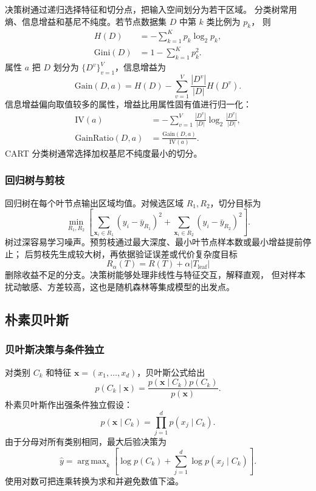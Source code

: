 \documentclass[UTF8,zihao=-4,a4paper,fontset=windows]{ctexart}
\DeclareMathOperator*{\argmax}{arg\,max}
\newcommand{\abs}[1]{\left|#1\right|}
\begin{document}
决策树通过递归选择特征和切分点，把输入空间划分为若干区域。
分类树常用熵、信息增益和基尼不纯度。若节点数据集 $D$ 中第 $k$ 类比例为 $p_k$，
则
\begin{align}
  H(D)&=-\sum_{k=1}^{K}p_k\log_2 p_k,\\
  \mathrm{Gini}(D)&=1-\sum_{k=1}^{K}p_k^2.
\end{align}
属性 $a$ 把 $D$ 划分为 $\{D^v\}_{v=1}^{V}$，信息增益为
\begin{equation}
  \mathrm{Gain}(D,a)
  =H(D)-\sum_{v=1}^{V}\frac{\abs{D^v}}{\abs D}H(D^v).
\end{equation}
信息增益偏向取值较多的属性，增益比用属性固有值进行归一化：
\begin{align}
  \mathrm{IV}(a)
  &=-\sum_{v=1}^{V}\frac{\abs{D^v}}{\abs D}
  \log_2\frac{\abs{D^v}}{\abs D},\\
  \mathrm{GainRatio}(D,a)
  &=\frac{\mathrm{Gain}(D,a)}{\mathrm{IV}(a)}.
\end{align}
CART 分类树通常选择加权基尼不纯度最小的切分。

\subsubsection{回归树与剪枝}

回归树在每个叶节点输出区域均值。对候选区域 $R_1,R_2$，切分目标为
\begin{equation}
  \min_{R_1,R_2}
  \left[
  \sum_{\bm{x}_i\in R_1}(y_i-\bar y_{R_1})^2+
  \sum_{\bm{x}_i\in R_2}(y_i-\bar y_{R_2})^2
  \right].
\end{equation}
树过深容易学习噪声。预剪枝通过最大深度、最小叶节点样本数或最小增益提前停止；
后剪枝先生成较大树，再依据验证误差或代价复杂度目标
\begin{equation}
  R_\alpha(T)=R(T)+\alpha\abs{T_{\mathrm{leaf}}}
\end{equation}
删除收益不足的分支。决策树能够处理非线性与特征交互，解释直观，
但对样本扰动敏感、方差较高，这也是随机森林等集成模型的出发点。

\subsection{朴素贝叶斯}

\subsubsection{贝叶斯决策与条件独立}

对类别 $C_k$ 和特征 $\bm{x}=(x_1,\ldots,x_d)$，贝叶斯公式给出
\begin{equation}
  p(C_k\mid\bm{x})
  =\frac{p(\bm{x}\mid C_k)p(C_k)}{p(\bm{x})}.
\end{equation}
朴素贝叶斯作出强条件独立假设：
\begin{equation}
  p(\bm{x}\mid C_k)
  =\prod_{j=1}^{d}p(x_j\mid C_k).
\end{equation}
由于分母对所有类别相同，最大后验决策为
\begin{equation}
  \hat y
  =\argmax_k\left[
  \log p(C_k)+
  \sum_{j=1}^{d}\log p(x_j\mid C_k)
  \right].
\end{equation}
使用对数可把连乘转换为求和并避免数值下溢。
\end{document}
